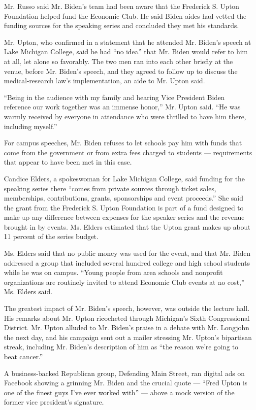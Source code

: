 Mr. Russo said Mr. Biden's team had been aware that the Frederick S.
Upton Foundation helped fund the Economic Club. He said Biden aides had
vetted the funding sources for the speaking series and concluded they
met his standards.

Mr. Upton, who confirmed in a statement that he attended Mr. Biden's
speech at Lake Michigan College, said he had ``no idea'' that Mr. Biden
would refer to him at all, let alone so favorably. The two men ran into
each other briefly at the venue, before Mr. Biden's speech, and they
agreed to follow up to discuss the medical-research law's
implementation, an aide to Mr. Upton said.

``Being in the audience with my family and hearing Vice President Biden
reference our work together was an immense honor,'' Mr. Upton said. ``He
was warmly received by everyone in attendance who were thrilled to have
him there, including myself.''

For campus speeches, Mr. Biden refuses to let schools pay him with funds
that come from the government or from extra fees charged to students ---
requirements that appear to have been met in this case.

Candice Elders, a spokeswoman for Lake Michigan College, said funding
for the speaking series there ``comes from private sources through
ticket sales, memberships, contributions, grants, sponsorships and event
proceeds.'' She said the grant from the Frederick S. Upton Foundation is
part of a fund designed to make up any difference between expenses for
the speaker series and the revenue brought in by events. Ms. Elders
estimated that the Upton grant makes up about 11 percent of the series
budget.

Ms. Elders said that no public money was used for the event, and that
Mr. Biden addressed a group that included several hundred college and
high school students while he was on campus. ``Young people from area
schools and nonprofit organizations are routinely invited to attend
Economic Club events at no cost,'' Ms. Elders said.

The greatest impact of Mr. Biden's speech, however, was outside the
lecture hall. His remarks about Mr. Upton ricocheted through Michigan's
Sixth Congressional District. Mr. Upton alluded to Mr. Biden's praise in
a debate with Mr. Longjohn the next day, and his campaign sent out a
mailer stressing Mr. Upton's bipartisan streak, including Mr. Biden's
description of him as ``the reason we're going to beat cancer.''

A business-backed Republican group, Defending Main Street, ran digital
ads on Facebook showing a grinning Mr. Biden and the crucial quote ---
``Fred Upton is one of the finest guys I've ever worked with'' --- above
a mock version of the former vice president's signature.

